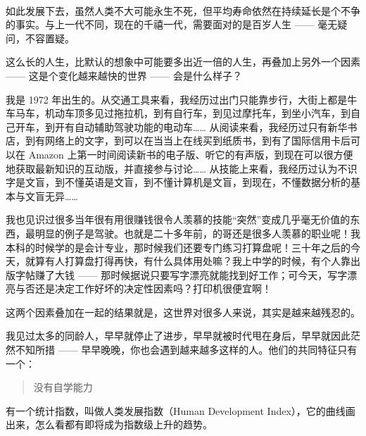 \documentclass[11pt]{article}
\begin{document}
    \begin{center}
    \end{center}
    { \hspace*{\fill} \\}
    
    如此发展下去，虽然人类不大可能永生不死，但平均寿命依然在持续延长是个不争的事实。与上一代不同，现在的千禧一代，需要面对的是百岁人生
------ 毫无疑问，不容置疑。

这么长的人生，比默认的想象中可能要多出近一倍的人生，再叠加上另外一个因素
------ 这是个变化越来越快的世界 ------ 会是什么样子？

我是 1972
年出生的。从交通工具来看，我经历过出门只能靠步行，大街上都是牛车马车，机动车顶多见过拖拉机，到有自行车，到见过摩托车，到坐小汽车，到自己开车，到开有自动辅助驾驶功能的电动车\ldots{}\ldots{}
从阅读来看，我经历过只有新华书店，到有网络上的文字，到可以在当当上在线买到纸质书，到有了国际信用卡后可以在
Amazon
上第一时间阅读新书的电子版、听它的有声版，到现在可以很方便地获取最新知识的互动版，并直接参与讨论\ldots{}\ldots{}
从技能上来看，我经历过认为不识字是文盲，到不懂英语是文盲，到不懂计算机是文盲，到现在，不懂数据分析的基本与文盲无异\ldots{}\ldots{}

我也见识过很多当年很有用很赚钱很令人羡慕的技能``突然''变成几乎毫无价值的东西，最明显的例子是驾驶。也就是二十多年前，的哥还是很多人羡慕的职业呢！我本科的时候学的是会计专业，那时候我们还要专门练习打算盘呢！三十年之后的今天，就算有人打算盘打得再快，有什么具体用处嘛？我上中学的时候，有个人靠出版字帖赚了大钱
------
那时候据说只要写字漂亮就能找到好工作；可今天，写字漂亮与否还是决定工作好坏的决定性因素吗？打印机很便宜啊！

这两个因素叠加在一起的结果就是，这世界对很多人来说，其实是越来越残忍的。

我见过太多的同龄人，早早就停止了进步，早早就被时代甩在身后，早早就因此茫然不知所措
------ 早早晚晚，你也会遇到越来越多这样的人。他们的共同特征只有一个：

\begin{quote}
没有自学能力
\end{quote}

有一个统计指数，叫做人类发展指数（Human Development
Index），它的曲线画出来，怎么看都有即将成为指数级上升的趋势。
\end{document}
